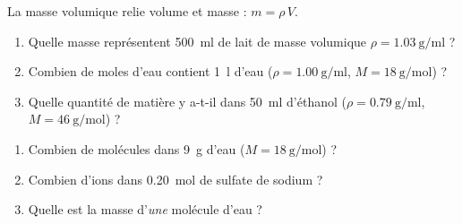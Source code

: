 \documentclass[11pt,a4paper]{article}
\begin{document}
\begin{exo}
La masse volumique relie volume et masse : $m=\rho\,V$.
\begin{enumerate}[label=\alph*)]
  \item Quelle masse représentent \qty{500}{\milli\litre} de lait de masse volumique
        $\rho=\qty{1.03}{\gram\per\milli\litre}$ ?
  \item Combien de moles d'eau contient \qty{1}{\litre} d'eau ($\rho=\qty{1.00}{\gram\per\milli\litre}$,
        $M=\qty{18}{\gram\per\mole}$) ?
  \item Quelle quantité de matière y a-t-il dans \qty{50}{\milli\litre} d'éthanol 
        ($\rho=\qty{0.79}{\gram\per\milli\litre}$, $M=\qty{46}{\gram\per\mole}$) ?
\end{enumerate}
\end{exo}

\begin{exo}
\begin{enumerate}[label=\alph*)]
  \item Combien de molécules dans \qty{9}{\gram} d'eau ($M=\qty{18}{\gram\per\mole}$) ?
  \item Combien d'ions  dans \qty{0.20}{\mole} de sulfate de sodium  ?
  \item Quelle est la masse d'\emph{une} molécule d'eau ?
\end{enumerate}
\end{exo}
\end{document}
